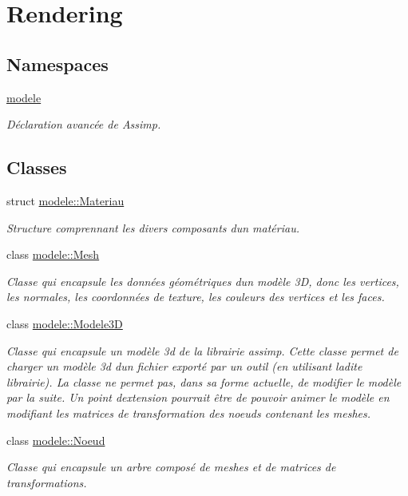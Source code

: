 \hypertarget{group__rendering}{}\section{Rendering}
\label{group__rendering}
\subsection*{Namespaces}
\begin{DoxyCompactItemize}
\item 
 \hyperlink{namespacemodele}{modele}
\begin{DoxyCompactList}\small\item\em Déclaration avancée de Assimp. \end{DoxyCompactList}\end{DoxyCompactItemize}
\subsection*{Classes}
\begin{DoxyCompactItemize}
\item 
struct \hyperlink{structmodele_1_1_materiau}{modele\+::\+Materiau}
\begin{DoxyCompactList}\small\item\em Structure comprennant les divers composants d\textquotesingle{}un matériau. \end{DoxyCompactList}\item 
class \hyperlink{classmodele_1_1_mesh}{modele\+::\+Mesh}
\begin{DoxyCompactList}\small\item\em Classe qui encapsule les données géométriques d\textquotesingle{}un modèle 3\+D, donc les vertices, les normales, les coordonnées de texture, les couleurs des vertices et les faces. \end{DoxyCompactList}\item 
class \hyperlink{classmodele_1_1_modele3_d}{modele\+::\+Modele3\+D}
\begin{DoxyCompactList}\small\item\em Classe qui encapsule un modèle 3d de la librairie \textquotesingle{}assimp\textquotesingle{}. Cette classe permet de charger un modèle 3d d\textquotesingle{}un fichier exporté par un outil (en utilisant ladite librairie). La classe ne permet pas, dans sa forme actuelle, de modifier le modèle par la suite. Un point d\textquotesingle{}extension pourrait être de pouvoir animer le modèle en modifiant les matrices de transformation des noeuds contenant les meshes. \end{DoxyCompactList}\item 
class \hyperlink{classmodele_1_1_noeud}{modele\+::\+Noeud}
\begin{DoxyCompactList}\small\item\em Classe qui encapsule un arbre composé de meshes et de matrices de transformations. \end{DoxyCompactList}\end{DoxyCompactItemize}
